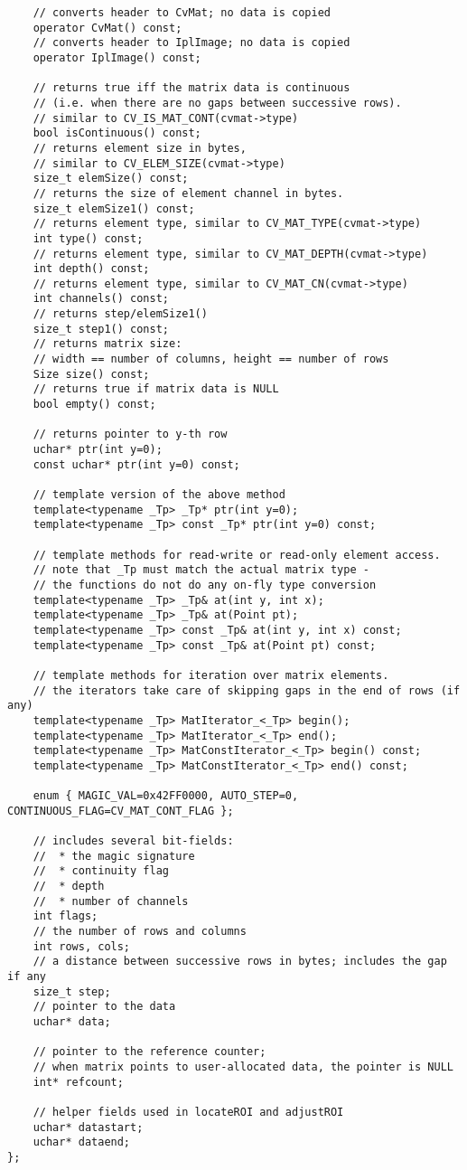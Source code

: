 \begin{lstlisting}
    // converts header to CvMat; no data is copied
    operator CvMat() const;
    // converts header to IplImage; no data is copied
    operator IplImage() const;

    // returns true iff the matrix data is continuous
    // (i.e. when there are no gaps between successive rows).
    // similar to CV_IS_MAT_CONT(cvmat->type)
    bool isContinuous() const;
    // returns element size in bytes,
    // similar to CV_ELEM_SIZE(cvmat->type)
    size_t elemSize() const;
    // returns the size of element channel in bytes.
    size_t elemSize1() const;
    // returns element type, similar to CV_MAT_TYPE(cvmat->type)
    int type() const;
    // returns element type, similar to CV_MAT_DEPTH(cvmat->type)
    int depth() const;
    // returns element type, similar to CV_MAT_CN(cvmat->type)
    int channels() const;
    // returns step/elemSize1()
    size_t step1() const;
    // returns matrix size:
    // width == number of columns, height == number of rows
    Size size() const;
    // returns true if matrix data is NULL
    bool empty() const;

    // returns pointer to y-th row
    uchar* ptr(int y=0);
    const uchar* ptr(int y=0) const;

    // template version of the above method
    template<typename _Tp> _Tp* ptr(int y=0);
    template<typename _Tp> const _Tp* ptr(int y=0) const;

    // template methods for read-write or read-only element access.
    // note that _Tp must match the actual matrix type -
    // the functions do not do any on-fly type conversion
    template<typename _Tp> _Tp& at(int y, int x);
    template<typename _Tp> _Tp& at(Point pt);
    template<typename _Tp> const _Tp& at(int y, int x) const;
    template<typename _Tp> const _Tp& at(Point pt) const;

    // template methods for iteration over matrix elements.
    // the iterators take care of skipping gaps in the end of rows (if any)
    template<typename _Tp> MatIterator_<_Tp> begin();
    template<typename _Tp> MatIterator_<_Tp> end();
    template<typename _Tp> MatConstIterator_<_Tp> begin() const;
    template<typename _Tp> MatConstIterator_<_Tp> end() const;

    enum { MAGIC_VAL=0x42FF0000, AUTO_STEP=0, CONTINUOUS_FLAG=CV_MAT_CONT_FLAG };

    // includes several bit-fields:
    //  * the magic signature
    //  * continuity flag
    //  * depth
    //  * number of channels
    int flags;
    // the number of rows and columns
    int rows, cols;
    // a distance between successive rows in bytes; includes the gap if any
    size_t step;
    // pointer to the data
    uchar* data;

    // pointer to the reference counter;
    // when matrix points to user-allocated data, the pointer is NULL
    int* refcount;

    // helper fields used in locateROI and adjustROI
    uchar* datastart;
    uchar* dataend;
};
\end{lstlisting}

